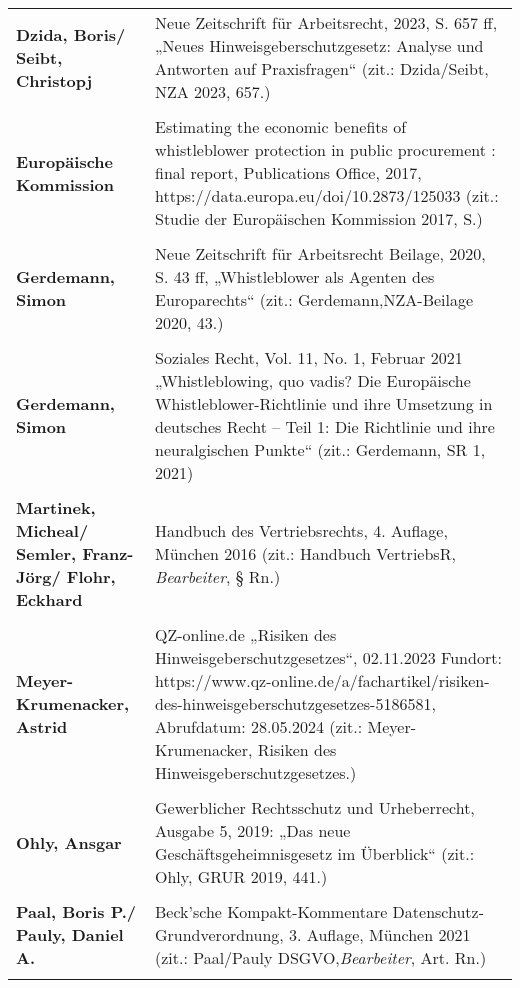 \begin{longtable}{R{5 cm}R{8,5 cm}}
    \textbf{Dzida, Boris/ Seibt, Christopj} & Neue Zeitschrift für Arbeitsrecht, 2023, S. 657 ff, „Neues Hinweisgeberschutzgesetz: Analyse und Antworten auf Praxisfragen“ (zit.: Dzida/Seibt, NZA 2023, 657.) \\
    \\

    \textbf{Europäische Kommission} & Estimating the economic benefits of whistleblower protection in public procurement : final report, Publications Office, 2017, https://data.europa.eu/doi/10.2873/125033 (zit.: Studie der Europäischen Kommission 2017, S.) \\
    \\
    
    \textbf{Gerdemann, Simon} & Neue Zeitschrift für Arbeitsrecht Beilage, 2020, S. 43 ff, „Whistleblower als Agenten des Europarechts“ (zit.: Gerdemann,NZA-Beilage 2020, 43.) \\
    \\

    \textbf{Gerdemann, Simon} & Soziales Recht, Vol. 11, No. 1, Februar 2021 „Whistleblowing, quo vadis? Die Europäische Whistleblower-Richtlinie und ihre Umsetzung in deutsches Recht – Teil 1: Die Richtlinie und ihre neuralgischen Punkte“ (zit.: Gerdemann, SR 1, 2021) \\
    \\

    \textbf{Martinek, Micheal/ Semler, Franz-Jörg/ Flohr, Eckhard} & Handbuch des Vertriebsrechts, 4. Auflage, München 2016 (zit.: Handbuch VertriebsR, \textit{Bearbeiter}, § Rn.) \\
    \\

    \textbf{Meyer-Krumenacker, Astrid} & QZ-online.de „Risiken des Hinweisgeberschutzgesetzes“, 02.11.2023 Fundort: https://www.qz-online.de/a/fachartikel/risiken-des-hinweisgeberschutzgesetzes-5186581, Abrufdatum: 28.05.2024 (zit.: Meyer-Krumenacker, Risiken des Hinweisgeberschutzgesetzes.) \\
    \\

    \textbf{Ohly, Ansgar} & Gewerblicher Rechtsschutz und Urheberrecht, Ausgabe 5, 2019: „Das neue Geschäftsgeheimnisgesetz im Überblick“ (zit.: Ohly, GRUR 2019, 441.) \\
    \\

    \textbf{Paal, Boris P./ Pauly, Daniel A.} & Beck'sche Kompakt-Kommentare Datenschutz-Grundverordnung, 3. Auflage, München 2021 (zit.: Paal/Pauly DSGVO,\textit{Bearbeiter}, Art. Rn.) \\
    \\


\end{longtable}
